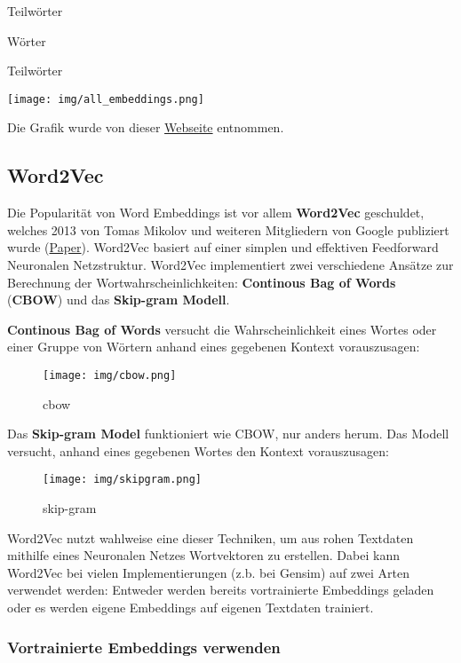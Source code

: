 \documentclass[11pt]{article}
\begin{document}
Teilwörter

Wörter

Teilwörter

    \texttt{[image: img/all\_embeddings.png]}

Die Grafik wurde von dieser
\href{https://towardsdatascience.com/from-pre-trained-word-embeddings-to-pre-trained-language-models-focus-on-bert-343815627598}{Webseite}
entnommen.

    \hypertarget{word2vec}{%
\subsection{Word2Vec}\label{word2vec}}

Die Popularität von Word Embeddings ist vor allem \textbf{Word2Vec}
geschuldet, welches 2013 von Tomas Mikolov und weiteren Mitgliedern von
Google publiziert wurde (\href{https://arxiv.org/abs/1301.3781}{Paper}).
Word2Vec basiert auf einer simplen und effektiven Feedforward Neuronalen
Netzstruktur. Word2Vec implementiert zwei verschiedene Ansätze zur
Berechnung der Wortwahrscheinlichkeiten: \textbf{Continous Bag of Words}
(\textbf{CBOW}) und das \textbf{Skip-gram Modell}.

\textbf{Continous Bag of Words} versucht die Wahrscheinlichkeit eines
Wortes oder einer Gruppe von Wörtern anhand eines gegebenen Kontext
vorauszusagen:

\begin{figure}
\centering
\texttt{[image: img/cbow.png]}
\caption{cbow}
\end{figure}

Das \textbf{Skip-gram Model} funktioniert wie CBOW, nur anders herum.
Das Modell versucht, anhand eines gegebenen Wortes den Kontext
vorauszusagen:

\begin{figure}
\centering
\texttt{[image: img/skipgram.png]}
\caption{skip-gram}
\end{figure}

Word2Vec nutzt wahlweise eine dieser Techniken, um aus rohen Textdaten
mithilfe eines Neuronalen Netzes Wortvektoren zu erstellen. Dabei kann
Word2Vec bei vielen Implementierungen (z.b. bei Gensim) auf zwei Arten
verwendet werden: Entweder werden bereits vortrainierte Embeddings
geladen oder es werden eigene Embeddings auf eigenen Textdaten
trainiert.

    \hypertarget{vortrainierte-embeddings-verwenden}{%
\subsubsection{Vortrainierte Embeddings
verwenden}\label{vortrainierte-embeddings-verwenden}}
\end{document}
